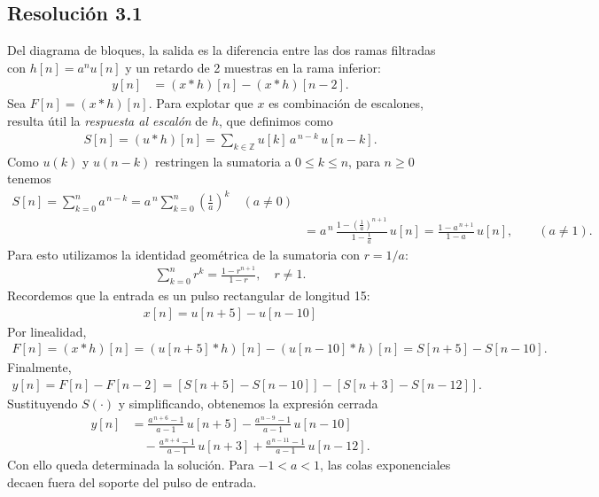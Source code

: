 \documentclass[
  11pt,
  letterpaper,
   addpoints,
  ]{exam}
\begin{document}
\begin{questions}
\begin{solution}
  \subsection*{Resolución 3.1}
Del diagrama de bloques, la salida es la diferencia entre las dos ramas filtradas con $h[n]=a^n u[n]$ y un retardo de 2 muestras en la rama inferior:
\begin{align}
  y[n] &= (x*h)[n] - (x*h)[n-2].
\end{align}
Sea $F[n]=(x*h)[n]$. Para explotar que $x$ es combinación de escalones, resulta útil la \emph{respuesta al escalón} de $h$, que definimos como
\begin{align}
  S[n] = (u*h)[n] = \sum_{k\in\mathbb{Z}} u[k] \, a^{\,n-k} \, u[n-k].
\end{align}
Como $u(k)$ y $u(n-k)$ restringen la sumatoria a $0\le k\le n$, para $n\ge 0$ tenemos
\begin{align}
  S[n] = \sum_{k=0}^{n} a^{\,n-k}
       = a^{\,n} \sum_{k=0}^{n} \left(\frac{1}{a}\right)^{\!k} \quad (a\ne 0) \\
       &= a^{\,n} \, \frac{1-\left(\frac{1}{a}\right)^{\!n+1}}{1-\frac{1}{a}}\,u[n]
       = \frac{1-a^{\,n+1}}{1-a}\,u[n],\qquad (a\ne 1).
\end{align}
Para esto utilizamos la identidad geométrica de la sumatoria con $r=1/a$:
\begin{align}
  \sum_{k=0}^n r^k = \frac{1-r^{n+1}}{1-r}, \quad r \neq 1.
\end{align}
Recordemos que la entrada es un pulso rectangular de longitud 15:
\begin{align}
  x[n] = u[n+5] - u[n-10]
\end{align}
Por linealidad,
\begin{align}
  F[n] = (x*h)[n] = (u[n+5]*h)[n] - (u[n-10]*h)[n] = S[n+5] - S[n-10].
\end{align}
Finalmente,
\begin{align}
  y[n] = F[n] - F[n-2] = [S[n+5] - S[n-10]] - [S[n+3] - S[n-12]].
\end{align}
Sustituyendo $S(\cdot)$ y simplificando, obtenemos la expresión cerrada
\begin{align}
  y[n]
  &= \frac{a^{\,n+6}-1}{a-1} \, u[n+5]
   - \frac{a^{\,n-9}-1}{a-1} \, u[n-10] \\
  &\quad - \frac{a^{\,n+4}-1}{a-1} \, u[n+3]
   + \frac{a^{\,n-11}-1}{a-1} \, u[n-12].
\end{align}
Con ello queda determinada la solución. Para $-1<a<1$, las colas exponenciales decaen fuera del soporte del pulso de entrada.
\end{solution}


\end{questions}
\end{document}
